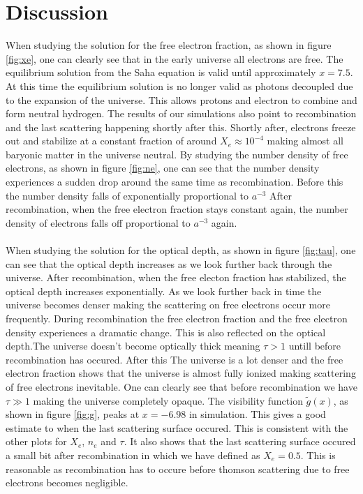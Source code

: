 \documentclass[onecolumn]{aastex62}
\begin{document}
\section{Discussion}\label{sec:discussion}
When studying the solution for the free electron fraction, as shown in figure \ref{fig:xe}, one can clearly see that in the early universe all electrons are free. The equilibrium solution from the Saha equation is valid until approximately $x=7.5$. At this time the equilibrium solution is no longer valid as photons decoupled due to the expansion of the universe. This allows protons and electron to combine and form neutral hydrogen. The results of our simulations also point to recombination and the last scattering happening shortly after this. Shortly after, electrons freeze out and stabilize at a constant fraction of around $X_e\approx10^{-4}$ making almost all baryonic matter in the universe neutral. By studying the number density of free electrons, as shown in figure \ref{fig:ne}, one can see that the number density experiences a sudden drop around the same time as recombination. Before this the number density falls of exponentially proportional to $a^{-3}$ After recombination, when the free electron fraction stays constant again, the number density of electrons falls off proportional to $a^{-3}$ again.\\\\\indent
When studying the solution for the optical depth, as shown in figure \ref{fig:tau}, one can see that the optical depth increases as we look further back through the universe. After recombination, when the free electon fraction has stabilized, the optical depth increases exponentially. As we look further back in time the universe becomes denser making the scattering on free electrons occur more frequently. During recombination the free electron fraction and the free electron density experiences a dramatic change. This is also reflected on the optical depth.The universe doesn't become optically thick meaning $\tau>1$ untill before recombination has occured. After this The universe is a lot denser and the free electron fraction shows that the universe is almost fully ionized making scattering of free electrons inevitable. One can clearly see that before recombination we have $\tau\gg 1$ making the universe completely opaque. The visibility function $\widetilde{g}(x)$, as shown in figure \ref{fig:g}, peaks at $x=-6.98$ in simulation. This gives a good estimate to when the last scattering surface occured. This is consistent with the other plots for $X_e$, $n_e$ and $\tau$. It also shows that the last scattering surface occured a small bit after recombination in which we have defined as $X_e=0.5$. This is reasonable as recombination has to occure before thomson scattering due to free electrons becomes negligible. \\\\\indent
\end{document}
